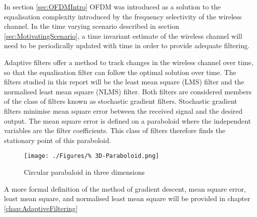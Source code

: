 In section \ref{sec:OFDMIntro} OFDM was introduced %
as a solution to the equalisation complexity introduced %
by the frequency selectivity of the wireless channel. In %
the time varying scenario described in section %
\ref{sec:MotivatingScenario}, a time invariant %
estimate of the wireless channel will need %
to be periodically updated with time in order %
to provide adequate filtering.

Adaptive filters offer a method to track changes in the %
wireless channel over time, so that the equalisation filter %
can follow the optimal solution over time. The filters %
studied in this report will be the least mean square (LMS) %
filter and the normalised least mean square (NLMS) filter. Both %
filters are considered members of the class of filters known %
as stochastic gradient filters. Stochastic gradient filters %
minimise mean square error between the received signal %
and the desired output. The mean square error is defined %
on a paraboloid where the independent variables are %
the filter coefficients. This class of filters therefore %
finds the stationary point of this paraboloid.
\begin{figure}[ht]
	\centering
	\texttt{[image: ./Figures/\%
3D-Paraboloid.png]}
	\caption{Circular parabaloid in three dimensions}
	\label{fig:Paraboloid}
\end{figure}
A more formal definition of the method of gradient descent, %
mean square error, least mean square, and normalised least mean %
square will be provided in chapter \ref{chap:AdaptiveFiltering}
